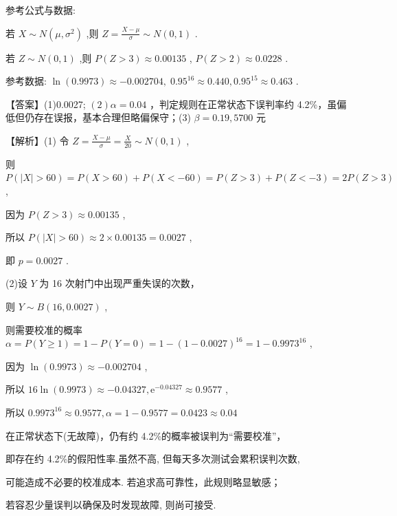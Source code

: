 \documentclass[10pt]{article}
\newcommand*\circled[1]{\tikz[baseline=(char.base)]{\node[shape=circle,draw,inner sep=1.5pt] (char) {\small #1};}}
\begin{document}
参考公式与数据:

 \circled{1} 若 \(X \sim  N\left( {\mu ,{\sigma }^{2}}\right)\) ,则 \(Z = \frac{X - \mu }{\sigma } \sim  N\left( {0,1}\right)\) .

 \circled{2} 若 \(Z \sim  N\left( {0,1}\right)\) ,则 \(P\left( {Z > 3}\right)  \approx  {0.00135}\) , \(P\left( {Z > 2}\right)  \approx  {0.0228}\) .

参考数据: \(\ln \left( {0.9973}\right)  \approx   - {0.002704},\;{0.95}^{16} \approx  {0.440},{0.95}^{15} \approx  {0.463}\) .

【答案】(1)0.0027; \(\left( 2\right) \alpha  = {0.04}\) ，判定规则在正常状态下误判率约 4.2\%，虽偏低但仍存在误报，基本合理但略偏保守；(3) \(\beta  = {0.19},{5700}\) 元

【解析】(1) 令 \(Z = \frac{X - \mu }{\sigma } = \frac{X}{20} \sim  N\left( {0,1}\right)\) ,

则 \(P\left( {\left| X\right|  > {60}}\right)  = P\left( {X > {60}}\right)  + P\left( {X <  - {60}}\right)  = P\left( {Z > 3}\right)  + P\left( {Z <  - 3}\right)  = {2P}\left( {Z > 3}\right)\) ,

因为 \(P\left( {Z > 3}\right)  \approx  {0.00135}\) ,

所以 \(P\left( {\left| X\right|  > {60}}\right)  \approx  2 \times  {0.00135} = {0.0027}\) ,

即 \(p = {0.0027}\) .

(2)设 \(Y\) 为 16 次射门中出现严重失误的次数，

则 \(Y \sim  B\left( {{16},{0.0027}}\right)\) ,

则需要校准的概率 \(\alpha  = P\left( {Y \geq  1}\right)  = 1 - P\left( {Y = 0}\right)  = 1 - {\left( 1 - {0.0027}\right) }^{16} = 1 - {0.9973}^{16}\) ,

因为 \(\ln \left( {0.9973}\right)  \approx   - {0.002704}\) ,

所以 \({16}\ln \left( {0.9973}\right)  \approx   - {0.04327},{\mathrm{e}}^{-{0.04327}} \approx  {0.9577}\) ,

所以 \({0.9973}^{16} \approx  {0.9577},\alpha  = 1 - {0.9577} = {0.0423} \approx  {0.04}\)

在正常状态下(无故障)，仍有约 4.2\%的概率被误判为“需要校准”，

即存在约 4.2\%的假阳性率.虽然不高, 但每天多次测试会累积误判次数,

可能造成不必要的校准成本. 若追求高可靠性，此规则略显敏感；

若容忍少量误判以确保及时发现故障, 则尚可接受.
\end{document}
